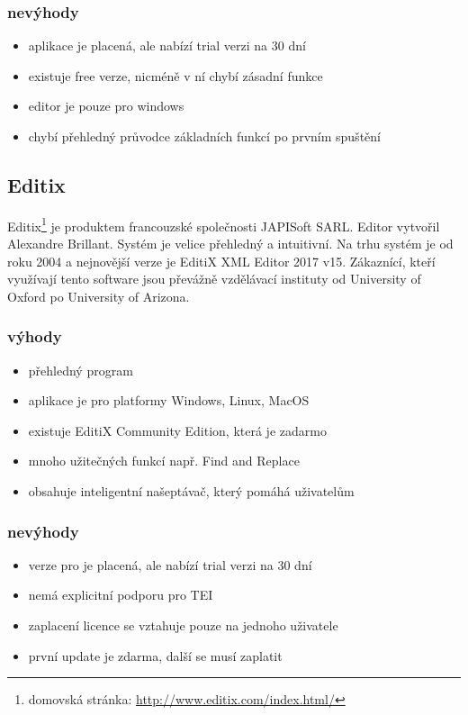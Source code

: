             \subsubsection{nevýhody}
                \begin{itemize}
                    \item aplikace je placená, ale nabízí trial verzi na 30 dní
                    \item existuje free verze, nicméně v ní chybí zásadní funkce
                    \item editor je pouze pro windows
                    \item chybí přehledný průvodce základních funkcí po prvním spuštění
                \end{itemize}
                
        \subsection{Editix} 
            Editix\footnote{domovská stránka: \url{http://www.editix.com/index.html/}} je produktem francouzské společnosti JAPISoft SARL. Editor vytvořil Alexandre Brillant. Systém je velice přehledný a intuitivní. Na trhu systém je od roku 2004 a nejnovější verze je EditiX XML Editor 2017 v15. Zákaznící, kteří využívají tento software jsou převážně vzdělávací instituty od University of Oxford po University of Arizona.
            
            \subsubsection{výhody}
                \begin{itemize}
                    \item přehledný program
                    \item aplikace je pro platformy Windows, Linux, MacOS	
                    \item existuje EditiX Community Edition, která je zadarmo
                    \item mnoho užitečných funkcí např. Find and Replace
                    \item obsahuje inteligentní našeptávač, který pomáhá uživatelům
                \end{itemize}
                
            \subsubsection{nevýhody}
                \begin{itemize}
                    \item verze pro je placená, ale nabízí trial verzi na 30 dní
                    \item nemá explicitní podporu pro TEI
                    \item zaplacení licence se vztahuje pouze na jednoho uživatele
                    \item první update je zdarma, další se musí zaplatit
                \end{itemize}
                
